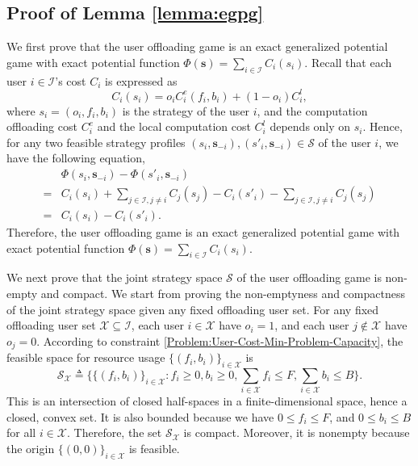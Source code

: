 \documentclass[lettersize,journal]{IEEEtran}
\begin{document}



\newpage
\appendix
\subsection{Proof of Lemma \ref{lemma:egpg}}\label{proof:lemma-egpg}
We first prove that the user offloading game is an exact generalized potential game with exact potential function $\Phi(\boldsymbol{s})=\sum_{i\in\mathcal{I}}C_i(s_i)$. Recall that each user $i\in\mathcal{I}$'s cost $C_i$ is expressed as
\begin{equation}
    C_i(s_i)=o_iC^e_i(f_i,b_i)+(1-o_i)C^l_i,
\end{equation}
where $s_i=(o_i,f_i,b_i)$ is the strategy of the user $i$, and the computation offloading cost $C^e_i$ and the local computation cost $C^l_i$ depends only on $s_i$. Hence, for any two feasible strategy profiles $(s_i,\boldsymbol{s}_{-i}),(s'_i,\boldsymbol{s}_{-i})\in\mathcal{S}$ of the user $i$, we have the following equation,
\begin{align}
    &\Phi(s_i,\boldsymbol{s}_{-i})-\Phi(s'_i,\boldsymbol{s}_{-i})\nonumber\\=&C_i(s_i)+\sum_{j\in\mathcal{I},j\ne i}C_j(s_j)-C_i(s'_i)-\sum_{j\in\mathcal{I},j\ne i}C_j(s_j)\nonumber\\=&C_i(s_i)-C_i(s'_i).
\end{align}
Therefore, the user offloading game is an exact generalized potential game with exact potential function $\Phi(\boldsymbol{s})=\sum_{i\in\mathcal{I}}C_i(s_i)$.

We next prove that the joint strategy space $\mathcal{S}$ of the user offloading game is non-empty and compact. We start from proving the non-emptyness and compactness of the joint strategy space given any fixed offloading user set. For any fixed offloading user set $\mathcal{X}\subseteq\mathcal{I}$, each user $i\in\mathcal{X}$ have $o_i=1$, and each user $j\notin\mathcal{X}$ have $o_j=0$. According to constraint \eqref{Problem:User-Cost-Min-Problem-Capacity}, the feasible space for resource usage $\{(f_i,b_i)\}_{i\in\mathcal{X}}$ is
\begin{equation}\label{eq:S_X}
    \mathcal{S}_{\mathcal{X}}\triangleq\bigg\{\{(f_i,b_i)\}_{i\in\mathcal{X}}:f_i\ge0,b_i\ge0,\sum_{i\in\mathcal{X}}f_i\le F, \sum_{i\in\mathcal{X}}b_i\le B\bigg\}.
\end{equation}
This is an intersection of closed half-spaces in a finite-dimensional space, hence a closed, convex set. It is also bounded because we have $0\le f_i\le F$, and $0\le b_i\le B$ for all $i\in\mathcal{X}$. Therefore, the set $\mathcal{S}_{\mathcal{X}}$ is compact. Moreover, it is nonempty because the origin $\{(0,0)\}_{i\in\mathcal{X}}$ is feasible.
\end{document}
